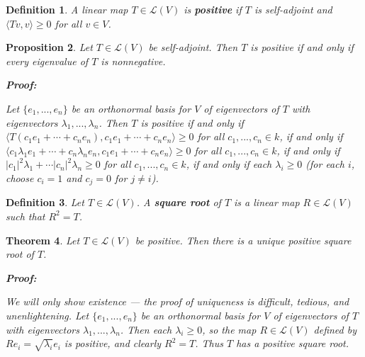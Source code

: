\documentclass{article}
\theoremstyle{colontheorem}
\newtheorem{theorem}{Theorem}[section]
\newtheorem{proposition}[theorem]{Proposition}
\newtheorem{definition}[theorem]{Definition}
\newenvironment{Theorem}
{
	\begin{mdframed}[backgroundcolor=TheoremOrange!10]
	\begin{theorem}
}
{
	\end{theorem}
	\end{mdframed}
	
	\vspace{.15in}
}
\newenvironment{Proposition}
{
	\begin{mdframed}[backgroundcolor=TheoremOrange!10]
	\begin{proposition}
}
{
	\end{proposition}
	\end{mdframed}
	
	\vspace{.15in}
}
\newenvironment{Def}
{
	\begin{mdframed}[backgroundcolor=DefGreen!10]
	\begin{definition}
}
{
	\end{definition}
	\end{mdframed}
	
	\vspace{.15in}
}
\newenvironment{Proof}
{
	\begin{mdframed}[backgroundcolor=ProofPurple!10]
	\textbf{Proof:}%
}
{
	\end{mdframed}
	
	\vspace{.085in}
}
\begin{document}
\begin{Def}
	
	A linear map $T \in \mathcal{L}(V)$ is \textbf{positive} if $T$ is self-adjoint and $\langle Tv, v \rangle \geq 0$ for all $v \in V$.
	
\end{Def}



\begin{Proposition}
	
	Let $T \in \mathcal{L}(V)$ be self-adjoint. Then $T$ is positive if and only if every eigenvalue of $T$ is nonnegative.
	
	\begin{Proof}
		Let $\{e_1, ..., e_n\}$ be an orthonormal basis for $V$ of eigenvectors of $T$ with eigenvectors $\lambda_1, ..., \lambda_n$. Then $T$ is positive if and only if $\langle T(c_1 e_1 + \cdots + c_n e_n), c_1 e_1 + \cdots + c_n e_n \rangle \geq 0$ for all $c_1, ..., c_n \in k$, if and only if $\langle c_1 \lambda_1 e_1 + \cdots + c_n \lambda_n  e_n, c_1 e_1 + \cdots + c_n e_n \rangle \geq 0$ for all $c_1, ..., c_n \in k$, if and only if $|c_1|^2 \lambda_1 + \cdots |c_n|^2 \lambda_n \geq 0$ for all $c_1, ..., c_n \in k$, if and only if each $\lambda_i \geq 0$ (for each $i$, choose $c_i = 1$ and $c_j = 0$ for $j \neq i$).
		
	\end{Proof}
	
\end{Proposition}



\begin{Def}
	
	Let $T \in \mathcal{L}(V)$. A \textbf{square root} of $T$ is a linear map $R \in \mathcal{L}(V)$ such that $R^2 = T$.
	
\end{Def}



\begin{Theorem}
	
	Let $T \in \mathcal{L}(V)$ be positive. Then there is a unique positive square root of $T$.
	
	\begin{Proof}
		We will only show existence --- the proof of uniqueness is difficult, tedious, and unenlightening. Let $\{e_1, ..., e_n\}$ be an orthonormal basis for $V$ of eigenvectors of $T$ with eigenvectors $\lambda_1, ..., \lambda_n$. Then each $\lambda_i \geq 0$, so the map $R \in \mathcal{L}(V)$ defined by $Re_i = \sqrt{\lambda_i} e_i$ is positive, and clearly $R^2 = T$. Thus $T$ has a positive square root.
				
	\end{Proof}
	
\end{Theorem}
\end{document}
